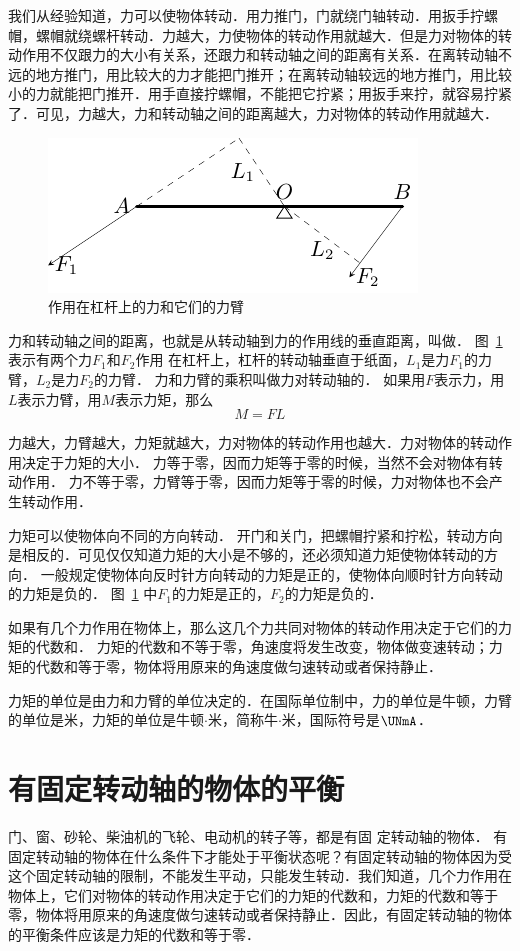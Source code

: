 我们从经验知道，力可以使物体转动．用力推门，门就绕门轴转动．用扳手拧螺帽，螺帽就绕螺杆转动．力越大，力使物体的转动作用就越大．但是力对物体的转动作用不仅跟力的大小有关系，还跟力和转动轴之间的距离有关系．在离转动轴不远的地方推门，用比较大的力才能把门推开；在离转动轴较远的地方推门，用比较小的力就能把门推开．用手直接拧螺帽，不能把它拧紧；用扳手来拧，就容易拧紧了．可见，力越大，力和转动轴之间的距离越大，力对物体的转动作用就越大．
\begin{figure}[htbp]
    \centering
    \includegraphics{fig/A/6-7.pdf}
    \caption{作用在杠杆上的力和它们的力臂}\label{fig_A_6-7}
\end{figure}

力和转动轴之间的距离，也就是从转动轴到力的作用线的垂直距离，叫做．
图~\ref{fig_A_6-7} 表示有两个力$F_1$和$F_2$作用
在杠杆上，杠杆的转动轴垂直于纸面，$L_1$是力$F_1$的力臂，$L_2$是力$F_2$的力臂．
力和力臂的乘积叫做力对转动轴的．
如果用$F$表示力，用$L$表示力臂，用$M$表示力矩，那么
\[M=FL\]


力越大，力臂越大，力矩就越大，力对物体的转动作用也越大．力对物体的转动作用决定于力矩的大小．
力等于零，因而力矩等于零的时候，当然不会对物体有转动作用．
力不等于零，力臂等于零，因而力矩等于零的时候，力对物体也不会产生转动作用．

力矩可以使物体向不同的方向转动．
开门和关门，把螺帽拧紧和拧松，转动方向是相反的．可见仅仅知道力矩的大小是不够的，还必须知道力矩使物体转动的方向．
一般规定使物体向反时针方向转动的力矩是正的，使物体向顺时针方向转动的力矩是负的．
图~\ref{fig_A_6-7} 中$F_1$的力矩是正的，$F_2$的力矩是负的．

如果有几个力作用在物体上，那么这几个力共同对物体的转动作用决定于它们的力矩的代数和．
力矩的代数和不等于零，角速度将发生改变，物体做变速转动；力矩的代数和等于零，物体将用原来的角速度做匀速转动或者保持静止．

力矩的单位是由力和力臂的单位决定的．在国际单位制中，力的单位是牛顿，力臂的单位是米，力矩的单位是牛顿$\cdot$米，简称牛$\cdot$米，国际符号是$\UNmA$．

\section{有固定转动轴的物体的平衡}
门、窗、砂轮、柴油机的飞轮、电动机的转子等，都是有固
定转动轴的物体．
有固定转动轴的物体在什么条件下才能处于平衡状态呢？有固定转动轴的物体因为受这个固定转动轴的限制，不能发生平动，只能发生转动．我们知道，几个力作用在物体上，它们对物体的转动作用决定于它们的力矩的代数和，力矩的代数和等于零，物体将用原来的角速度做匀速转动或者保持静止．因此，有固定转动轴的物体的平衡条件应该是力矩的代数和等于零．

